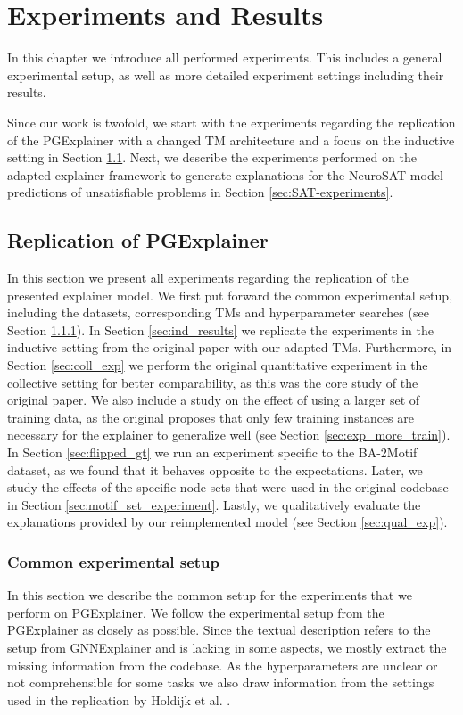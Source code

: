\chapter{Experiments and Results}
\label{ch:Experiments}

In this chapter we introduce all performed experiments. This includes a general experimental setup, as well as more detailed experiment settings including their results.

Since our work is twofold, we start with the experiments regarding the replication of the PGExplainer with a changed \ac{TM} architecture and a focus on the inductive setting in Section \ref{sec:experiments_replication}. Next, we describe the experiments performed on the adapted explainer framework to generate explanations for the NeuroSAT model predictions of unsatisfiable problems in Section \ref{sec:SAT-experiments}.

\section{Replication of PGExplainer}
\label{sec:experiments_replication}
In this section we present all experiments regarding the replication of the presented explainer model. We first put forward the common experimental setup, including the datasets, corresponding \acp{TM} and hyperparameter searches (see Section \ref{sec:PGE_exp_setup}). In Section \ref{sec:ind_results} we replicate the experiments in the inductive setting from the original paper with our adapted \acp{TM}. Furthermore, in Section \ref{sec:coll_exp} we perform the original quantitative experiment in the collective setting for better comparability, as this was the core study of the original paper. We also include a study on the effect of using a larger set of training data, as the original proposes that only few training instances are necessary for the explainer to generalize well (see Section \ref{sec:exp_more_train}). In Section \ref{sec:flipped_gt} we run an experiment specific to the BA-2Motif dataset, as we found that it behaves opposite to the expectations. Later, we study the effects of the specific node sets that were used in the original codebase in Section \ref{sec:motif_set_experiment}. Lastly, we qualitatively evaluate the explanations provided by our reimplemented model (see Section \ref{sec:qual_exp}).

\subsection{Common experimental setup}
\label{sec:PGE_exp_setup}
In this section we describe the common setup for the experiments that we perform on PGExplainer.
We follow the experimental setup from the PGExplainer as closely as possible. Since the textual description refers to the setup from GNNExplainer and is lacking in some aspects, we mostly extract the missing information from the codebase. As the hyperparameters are unclear or not comprehensible for some tasks we also draw information from the settings used in the replication by Holdijk et al. \cite{holdijk2021re}. \bigskip

